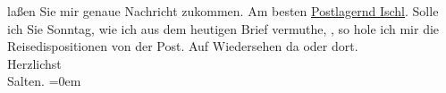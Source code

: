 \begin{ledgroupsized}[t]{13cm}
               laßen Sie mir genaue Nachricht zukommen. Am besten \uline{Postlagernd Ischl}.\pend
           \pstart
           Solle ich Sie Sonntag, wie ich aus dem heutigen Brief
               vermuthe, \label{K_L03308-4v}\label{K_L03308-4h}, so hole ich mir die
               Reisedispositionen von der Post.\pend
           \pstart
           Auf Wiedersehen da oder dort. {\\[\baselineskip]}Herzlichst {\\[\baselineskip]}\spacefill\mbox{Salten.}\pend
           \leftskip=0em{}
         
         \endnumbering{}\end{ledgroupsized}  \newcommand{\dateiname}{L03308}\newcommand{\titel}{Felix Salten an Arthur Schnitzler, 7. 8. 1900}\newcommand{\editorInnen}{Martin Anton Müller und Laura Untner}
      